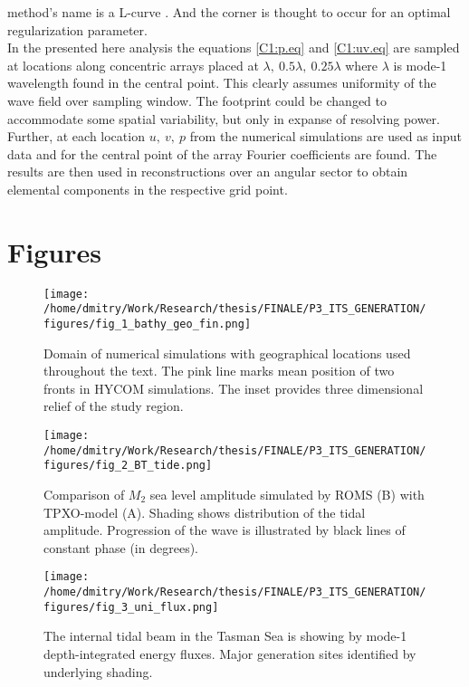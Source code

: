 \documentclass[12pt]{article}
\newcommand{\SCALET}{1.25}
\begin{document}
method's name is a L-curve \citep{hansen1999curve}. And the corner is thought to occur for an 
optimal regularization parameter.\\
In the presented here analysis the equations \eqref{C1:p.eq} and \eqref{C1:uv.eq} are sampled at locations along concentric 
arrays placed at $\lambda,~0.5\lambda,~0.25\lambda$ where $\lambda$ is mode-1 wavelength found in 
the central point. This clearly assumes uniformity of the wave field over sampling window. The 
footprint could be changed to accommodate some spatial variability, but only in expanse of 
resolving power. Further, at each location $u,~v,~p$ from the numerical simulations are used as 
input data and for the central point of the array Fourier coefficients are found. The results are 
then used in reconstructions over an angular sector to obtain elemental components in the 
respective grid point.

\newpage
\section{Figures}

\begin{figure}
	\centering
	\texttt{[image: /home/dmitry/Work/Research/thesis/FINALE/P3\_ITS\_GENERATION/figures/fig\_1\_bathy\_geo\_fin.png]}
	\caption{Domain of numerical simulations with geographical locations used throughout the text. 
	The pink line marks mean position of two fronts in HYCOM simulations. The inset provides 
	three dimensional relief of the study region.}
	\label{C3.fig:geo.map}
\end{figure}

\begin{figure}
	\centering
	\texttt{[image: /home/dmitry/Work/Research/thesis/FINALE/P3\_ITS\_GENERATION/figures/fig\_2\_BT\_tide.png]}
	\caption{Comparison of $M_2$ sea level amplitude simulated by ROMS (B) with 
	TPXO-model (A). Shading shows distribution of the tidal amplitude. Progression of the wave is 
	illustrated by black lines of constant phase (in degrees).}
	\label{C3.fig:BT}
\end{figure}

\begin{figure}
	\centering
	\texttt{[image: /home/dmitry/Work/Research/thesis/FINALE/P3\_ITS\_GENERATION/figures/fig\_3\_uni\_flux.png]}
	\caption{The internal tidal beam in the Tasman Sea is showing by mode-1 depth-integrated energy 
	fluxes. Major 
	generation sites identified by underlying shading.}
	\label{C3.fig:beam}
\end{figure}
\end{document}
